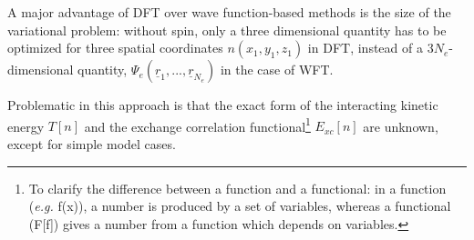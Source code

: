 \documentclass[11pt,DIV=13,BCOR=5mm,a4paper,headinclude]{scrbook}
\renewcommand{\vec}[1]{\underline{#1}}
\begin{document}
A major advantage of DFT over wave function-based methods is the size of the variational problem: without spin, only a three dimensional quantity has to be optimized for three spatial coordinates $n(x_1,y_1,z_1)$ in DFT, instead of a $3N_e$-dimensional quantity, $\Psi_e(\vec{r}_1,...,\vec{r}_{N_e})$ in the case of WFT. %

Problematic in this approach is that the exact form of the interacting kinetic energy $T[n]$ and the exchange correlation functional\footnote{To clarify the difference between a function and a functional: in a function (\textit{e.g.} f(x)), a number is produced by a set of variables, whereas a functional (F[f]) gives a number from a function which depends on variables.} $E_{xc}[n]$ are unknown, except for simple model cases.
\end{document}
